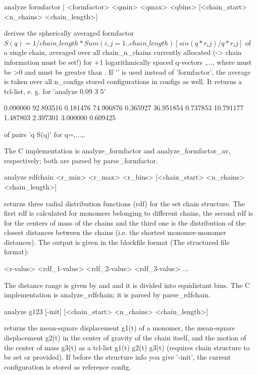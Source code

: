 {\begin{tclcode}
 analyze { formfactor | <formfactor> } <qmin> <qmax>
 <qbins> [<chain_start> <n_chains> <chain_length>] 
\end{tclcode}
derives the spherically averaged formfactor $ S(q) = 1/chain\_length * Sum(i,j=1..chain\_length)[sin(q*r_ij)/q*r_ij] $ of a single chain, averaged over all chain\_n\_chains currently allocated (-> chain information must be set!) for +1 logarithmically spaced q-vectors ,..., where  must be >0 and  must be greater than . If '' is used instead of 'formfactor', the average is taken over all n\_configs stored configurations in configs as well. It returns a tcl-list, e. g. for 'analyze  0.09 3 5'

{0.090000 92.893516} {0.181476 74.906876} {0.365927 36.951854} {0.737853 10.791177} {1.487803 2.397301} {3.000000 0.609425} 

of pairs '{q S(q)}' for q=,...,.

The C implementation is analyze\_formfactor and analyze\_formfactor\_av, respectively; both are parsed by parse\_formfactor.

\begin{tclcode}
 analyze rdfchain { <r_min> <r_max> <r_bins> } [<chain_start>
 <n_chains> <chain_length>] 
\end{tclcode}
returns three radial distribution functions (rdf) for the set chain structure. The first rdf is calculated for monomers belonging to different chains, the second rdf is for the centers of mass of the chains and the third one is the distribution of the closest distances between the chains (i.e. the shortest monomer-monomer distances). The output is given in the blockfile format (The structured file format):
\begin{tclcode}
 { <r-value> <rdf_1-value> <rdf_2-value> <rdf_3-value>} ...
\end{tclcode}
The distance range is given by  and  and it is divided into  equidistant bins. The C implementation is analyze\_rdfchain; it is parsed by parse\_rdfchain.

\begin{tclcode}
 analyze g123 [-init] [<chain_start> <n_chains> <chain_length>] 
\end{tclcode}
returns the mean-square displacement g1(t) of a monomer, the mean-square displacement g2(t) in the center of gravity of the chain itself, and the motion of the center of mass g3(t) as a tcl-list {g1(t) g2(t) g3(t)} (requires chain structure to be set or provided).
If before the structure info you give '-init', the current configuration is stored as reference config.

}
